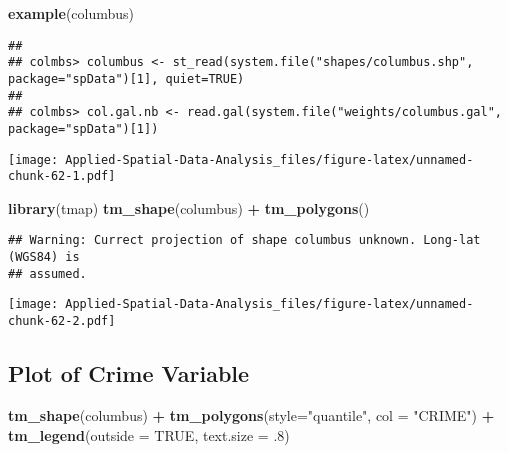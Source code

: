 \documentclass[
]{book}
\newenvironment{Shaded}{\begin{snugshade}}{\end{snugshade}}
\newcommand{\DataTypeTok}[1]{\textcolor[rgb]{0.13,0.29,0.53}{#1}}
\newcommand{\FloatTok}[1]{\textcolor[rgb]{0.00,0.00,0.81}{#1}}
\newcommand{\KeywordTok}[1]{\textcolor[rgb]{0.13,0.29,0.53}{\textbf{#1}}}
\newcommand{\NormalTok}[1]{#1}
\newcommand{\OperatorTok}[1]{\textcolor[rgb]{0.81,0.36,0.00}{\textbf{#1}}}
\newcommand{\OtherTok}[1]{\textcolor[rgb]{0.56,0.35,0.01}{#1}}
\newcommand{\StringTok}[1]{\textcolor[rgb]{0.31,0.60,0.02}{#1}}
\begin{document}
\begin{Shaded}
\begin{Highlighting}[]
\KeywordTok{example}\NormalTok{(columbus)}
\end{Highlighting}
\end{Shaded}

\begin{verbatim}
## 
## colmbs> columbus <- st_read(system.file("shapes/columbus.shp", package="spData")[1], quiet=TRUE)
## 
## colmbs> col.gal.nb <- read.gal(system.file("weights/columbus.gal", package="spData")[1])
\end{verbatim}

\begin{Shaded}
\end{Shaded}

\texttt{[image: Applied-Spatial-Data-Analysis\_files/figure-latex/unnamed-chunk-62-1.pdf]}

\begin{Shaded}
\begin{Highlighting}[]
\KeywordTok{library}\NormalTok{(tmap)}
\KeywordTok{tm_shape}\NormalTok{(columbus) }\OperatorTok{+}\StringTok{ }\KeywordTok{tm_polygons}\NormalTok{()}
\end{Highlighting}
\end{Shaded}

\begin{verbatim}
## Warning: Currect projection of shape columbus unknown. Long-lat (WGS84) is
## assumed.
\end{verbatim}

\texttt{[image: Applied-Spatial-Data-Analysis\_files/figure-latex/unnamed-chunk-62-2.pdf]}

\hypertarget{plot-of-crime-variable}{%
\subsection{Plot of Crime Variable}\label{plot-of-crime-variable}}

\begin{Shaded}
\begin{Highlighting}[]
\KeywordTok{tm_shape}\NormalTok{(columbus) }\OperatorTok{+}\StringTok{ }\KeywordTok{tm_polygons}\NormalTok{(}\DataTypeTok{style=}\StringTok{"quantile"}\NormalTok{, }\DataTypeTok{col =} \StringTok{"CRIME"}\NormalTok{) }\OperatorTok{+}
\StringTok{  }\KeywordTok{tm_legend}\NormalTok{(}\DataTypeTok{outside =} \OtherTok{TRUE}\NormalTok{, }\DataTypeTok{text.size =} \FloatTok{.8}\NormalTok{)}
\end{Highlighting}
\end{Shaded}
\end{document}
